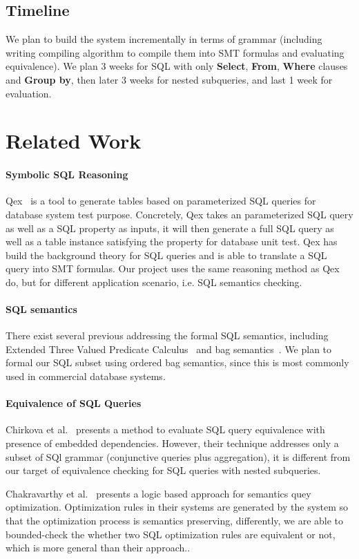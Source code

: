 \documentclass{article}
\begin{document}
\subsection{Timeline}

We plan to build the system incrementally in terms of grammar (including writing compiling algorithm to compile them into SMT formulas and evaluating equivalence). We plan 3 weeks for SQL with only \textbf{Select}, \textbf{From}, \textbf{Where} clauses and \textbf{Group by}, then later 3 weeks for nested subqueries, and last 1 week for evaluation.

\section{Related Work}

\paragraph{Symbolic SQL Reasoning} Qex~\cite{veanes2010qex,veanes2009symbolic} is a tool to generate tables based on parameterized SQL queries for database system test purpose. Concretely, Qex takes an parameterized SQL query as well as a SQL property as inputs, it will then generate a full SQL query as well as a table instance satisfying the property for database unit test. Qex has build the background theory for SQL queries and is able to translate a SQL query into SMT formulas. Our project uses the same reasoning method as Qex do, but for different application scenario, i.e. SQL semantics checking.

\paragraph{SQL semantics} There exist several previous addressing the formal SQL semantics, including Extended Three Valued Predicate Calculus~\cite{Negri:1991:FSS:111197.111212} and bag semantics~\cite{chinaei2007ordered}. We plan to formal our SQL subset using ordered bag semantics, since this is most commonly used in commercial database systems.

\paragraph{Equivalence of SQL Queries} Chirkova et al.~\cite{chirkova2009equivalence} presents a method to evaluate SQL query equivalence with presence of embedded dependencies. However, their technique addresses only a subset of SQl grammar (conjunctive queries plus aggregation), it is different from our target of equivalence checking for SQL queries with nested subqueries. 

Chakravarthy et al.~\cite{Chakravarthy:1990:LAS:78922.78924} presents a logic based approach for semantics quey optimization. Optimization rules in their systems are generated by the system so that the optimization process is semantics preserving, differently, we are able to bounded-check the whether two SQL optimization rules are equivalent or not, which is more general than their approach..

{}

\end{document}
